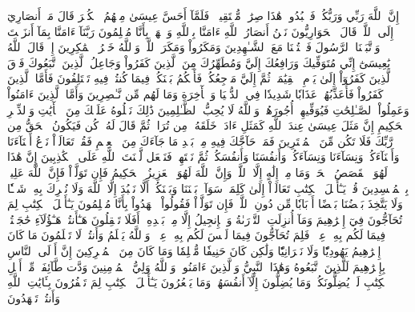 إِنَّ ٱللَّهَ رَبِّي وَرَبُّكُمۡ فَٱعۡبُدُوهُۚ هَٰذَا صِرَٰطٞ مُّسۡتَقِيمٞ
۞فَلَمَّآ أَحَسَّ عِيسَىٰ مِنۡهُمُ ٱلۡكُفۡرَ قَالَ مَنۡ أَنصَارِيٓ إِلَى ٱللَّهِۖ قَالَ ٱلۡحَوَارِيُّونَ نَحۡنُ أَنصَارُ ٱللَّهِ ءَامَنَّا بِٱللَّهِ وَٱشۡهَدۡ بِأَنَّا مُسۡلِمُونَ
رَبَّنَآ ءَامَنَّا بِمَآ أَنزَلۡتَ وَٱتَّبَعۡنَا ٱلرَّسُولَ فَٱكۡتُبۡنَا مَعَ ٱلشَّـٰهِدِينَ
وَمَكَرُواْ وَمَكَرَ ٱللَّهُۖ وَٱللَّهُ خَيۡرُ ٱلۡمَٰكِرِينَ
إِذۡ قَالَ ٱللَّهُ يَٰعِيسَىٰٓ إِنِّي مُتَوَفِّيكَ وَرَافِعُكَ إِلَيَّ وَمُطَهِّرُكَ مِنَ ٱلَّذِينَ كَفَرُواْ وَجَاعِلُ ٱلَّذِينَ ٱتَّبَعُوكَ فَوۡقَ ٱلَّذِينَ كَفَرُوٓاْ إِلَىٰ يَوۡمِ ٱلۡقِيَٰمَةِۖ ثُمَّ إِلَيَّ مَرۡجِعُكُمۡ فَأَحۡكُمُ بَيۡنَكُمۡ فِيمَا كُنتُمۡ فِيهِ تَخۡتَلِفُونَ
فَأَمَّا ٱلَّذِينَ كَفَرُواْ فَأُعَذِّبُهُمۡ عَذَابٗا شَدِيدٗا فِي ٱلدُّنۡيَا وَٱلۡأٓخِرَةِ وَمَا لَهُم مِّن نَّـٰصِرِينَ
وَأَمَّا ٱلَّذِينَ ءَامَنُواْ وَعَمِلُواْ ٱلصَّـٰلِحَٰتِ فَيُوَفِّيهِمۡ أُجُورَهُمۡۗ وَٱللَّهُ لَا يُحِبُّ ٱلظَّـٰلِمِينَ
ذَٰلِكَ نَتۡلُوهُ عَلَيۡكَ مِنَ ٱلۡأٓيَٰتِ وَٱلذِّكۡرِ ٱلۡحَكِيمِ
إِنَّ مَثَلَ عِيسَىٰ عِندَ ٱللَّهِ كَمَثَلِ ءَادَمَۖ خَلَقَهُۥ مِن تُرَابٖ ثُمَّ قَالَ لَهُۥ كُن فَيَكُونُ
ٱلۡحَقُّ مِن رَّبِّكَ فَلَا تَكُن مِّنَ ٱلۡمُمۡتَرِينَ
فَمَنۡ حَآجَّكَ فِيهِ مِنۢ بَعۡدِ مَا جَآءَكَ مِنَ ٱلۡعِلۡمِ فَقُلۡ تَعَالَوۡاْ نَدۡعُ أَبۡنَآءَنَا وَأَبۡنَآءَكُمۡ وَنِسَآءَنَا وَنِسَآءَكُمۡ وَأَنفُسَنَا وَأَنفُسَكُمۡ ثُمَّ نَبۡتَهِلۡ فَنَجۡعَل لَّعۡنَتَ ٱللَّهِ عَلَى ٱلۡكَٰذِبِينَ
إِنَّ هَٰذَا لَهُوَ ٱلۡقَصَصُ ٱلۡحَقُّۚ وَمَا مِنۡ إِلَٰهٍ إِلَّا ٱللَّهُۚ وَإِنَّ ٱللَّهَ لَهُوَ ٱلۡعَزِيزُ ٱلۡحَكِيمُ
فَإِن تَوَلَّوۡاْ فَإِنَّ ٱللَّهَ عَلِيمُۢ بِٱلۡمُفۡسِدِينَ
قُلۡ يَـٰٓأَهۡلَ ٱلۡكِتَٰبِ تَعَالَوۡاْ إِلَىٰ كَلِمَةٖ سَوَآءِۭ بَيۡنَنَا وَبَيۡنَكُمۡ أَلَّا نَعۡبُدَ إِلَّا ٱللَّهَ وَلَا نُشۡرِكَ بِهِۦ شَيۡـٔٗا وَلَا يَتَّخِذَ بَعۡضُنَا بَعۡضًا أَرۡبَابٗا مِّن دُونِ ٱللَّهِۚ فَإِن تَوَلَّوۡاْ فَقُولُواْ ٱشۡهَدُواْ بِأَنَّا مُسۡلِمُونَ
يَـٰٓأَهۡلَ ٱلۡكِتَٰبِ لِمَ تُحَآجُّونَ فِيٓ إِبۡرَٰهِيمَ وَمَآ أُنزِلَتِ ٱلتَّوۡرَىٰةُ وَٱلۡإِنجِيلُ إِلَّا مِنۢ بَعۡدِهِۦٓۚ أَفَلَا تَعۡقِلُونَ
هَـٰٓأَنتُمۡ هَـٰٓؤُلَآءِ حَٰجَجۡتُمۡ فِيمَا لَكُم بِهِۦ عِلۡمٞ فَلِمَ تُحَآجُّونَ فِيمَا لَيۡسَ لَكُم بِهِۦ عِلۡمٞۚ وَٱللَّهُ يَعۡلَمُ وَأَنتُمۡ لَا تَعۡلَمُونَ
مَا كَانَ إِبۡرَٰهِيمُ يَهُودِيّٗا وَلَا نَصۡرَانِيّٗا وَلَٰكِن كَانَ حَنِيفٗا مُّسۡلِمٗا وَمَا كَانَ مِنَ ٱلۡمُشۡرِكِينَ
إِنَّ أَوۡلَى ٱلنَّاسِ بِإِبۡرَٰهِيمَ لَلَّذِينَ ٱتَّبَعُوهُ وَهَٰذَا ٱلنَّبِيُّ وَٱلَّذِينَ ءَامَنُواْۗ وَٱللَّهُ وَلِيُّ ٱلۡمُؤۡمِنِينَ
وَدَّت طَّآئِفَةٞ مِّنۡ أَهۡلِ ٱلۡكِتَٰبِ لَوۡ يُضِلُّونَكُمۡ وَمَا يُضِلُّونَ إِلَّآ أَنفُسَهُمۡ وَمَا يَشۡعُرُونَ
يَـٰٓأَهۡلَ ٱلۡكِتَٰبِ لِمَ تَكۡفُرُونَ بِـَٔايَٰتِ ٱللَّهِ وَأَنتُمۡ تَشۡهَدُونَ
